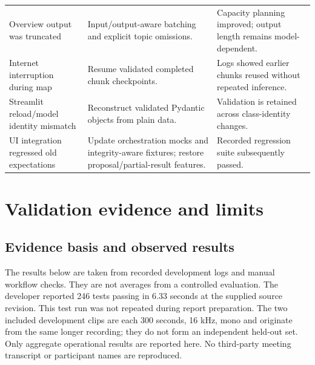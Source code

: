 \documentclass[11pt,a4paper]{article}
\begin{document}
\begin{longtable}{@{}>{\raggedright\arraybackslash}p{}>{\raggedright\arraybackslash}p{}>{\raggedright\arraybackslash}p{}@{}}
Overview output was truncated & Input/output-aware batching and explicit topic omissions. & Capacity planning improved; output length remains model-dependent.\\[5pt]
Internet interruption during map & Resume validated completed chunk checkpoints. & Logs showed earlier chunks reused without repeated inference.\\[5pt]
Streamlit reload/model identity mismatch & Reconstruct validated Pydantic objects from plain data. & Validation is retained across class-identity changes.\\[5pt]
UI integration regressed old expectations & Update orchestration mocks and integrity-aware fixtures; restore proposal/partial-result features. & Recorded regression suite subsequently passed.\\
\bottomrule
\end{longtable}
\normalsize

\section{Validation evidence and limits}
\subsection{Evidence basis and observed results}
The results below are taken from recorded development logs and manual workflow checks. They are not averages from a controlled evaluation. The developer reported 246 tests passing in 6.33 seconds at the supplied source revision. This test run was not repeated during report preparation. The two included development clips are each 300 seconds, 16 kHz, mono and originate from the same longer recording; they do not form an independent held-out set. Only aggregate operational results are reported here. No third-party meeting transcript or participant names are reproduced.
\end{document}
